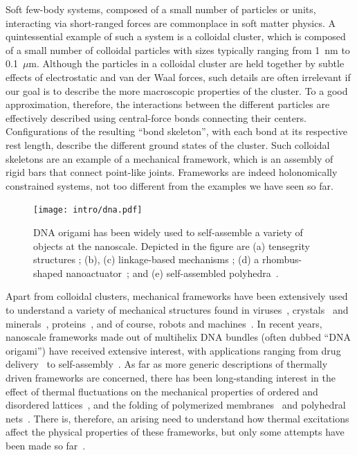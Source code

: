 Soft few-body systems, composed of a small number of particles or units, interacting via short-ranged forces are commonplace in soft matter physics.
A quintessential example of such a system is a colloidal cluster, which is composed of a small number of colloidal particles with sizes typically ranging from 1~nm to 0.1~$\mu$m.
Although the particles in a colloidal cluster are held together by subtle effects of electrostatic and van der Waal forces, such details are often irrelevant if our goal is to describe the more macroscopic properties of the cluster.
To a good approximation, therefore, the interactions between the different particles are effectively described using central-force bonds connecting their centers.
Configurations of the resulting ``bond skeleton'', with each bond at its respective rest length, describe the different ground states of the cluster.
Such colloidal skeletons are an example of a mechanical framework, which is an assembly of rigid bars that connect point-like joints.
Frameworks are indeed holonomically constrained systems, not too different from the examples we have seen so far.
%
\begin{figure}
  \begin{center}
    \texttt{[image: intro/dna.pdf]}
  \end{center}
  \caption{DNA origami has been widely used to self-assemble a variety of objects at the nanoscale.
Depicted in the figure are (a) tensegrity structures \cite{liedl2010}; (b), (c) linkage-based mechanisms \cite{marras2015,zhou2015}; (d) a rhombus-shaped nanoactuator~\cite{ke2016}; and (e) self-assembled polyhedra~\cite{iinuma2014}.}
  \label{fig:dna_origami}
\end{figure}

Apart from colloidal clusters, mechanical frameworks have been extensively used to understand a variety of mechanical structures found in viruses~\cite{hespenheide2004},
crystals~\cite{power2014} and minerals~\cite{kapko2011},
proteins~\cite{gaspar2012}, and of course,
robots and machines~\cite{farber2008,donelan2007}.
In recent years, nanoscale frameworks made out of multihelix DNA bundles (often dubbed ``DNA origami'') have received extensive interest, with applications ranging from drug delivery~\cite{zhao2019} to self-assembly~\cite{liedl2010}.
As far as more generic descriptions of thermally driven frameworks are concerned, there has been long-standing interest in the effect of thermal fluctuations on the mechanical properties of ordered and disordered lattices~\cite{zhang2016,woodhouse2018,yan2018}, and the folding of polymerized membranes~\cite{di-francesco2000,nelson2004} and polyhedral nets~\cite{shenoy2012,dodd2018,melo2020}.
There is, therefore, an arising need to understand how thermal excitations affect the physical properties of these frameworks, but only some attempts have been made so far~\cite{kallus2017,rocklin2018}.

